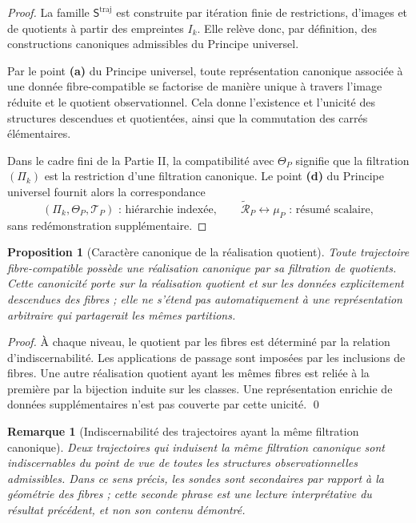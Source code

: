 \documentclass[11pt,a4paper,openany]{book}
\newtheorem{proposition}[definition]{Proposition}
\newtheorem{remark}[definition]{Remarque}
\begin{document}
\begin{proof}
La famille \(\mathsf S^{\mathrm{traj}}\) est construite par itération finie de restrictions, d'images et de quotients à partir des empreintes \(I_k\). Elle relève donc, par définition, des constructions canoniques admissibles du Principe universel.

Par le point \textbf{(a)} du Principe universel, toute représentation canonique associée à une donnée fibre-compatible se factorise de manière unique à travers l'image réduite et le quotient observationnel. Cela donne l'existence et l'unicité des structures descendues et quotientées, ainsi que la commutation des carrés élémentaires.

Dans le cadre fini de la Partie II, la compatibilité avec \(\Theta_P\) signifie que la filtration \((\Pi_k)\) est la restriction d'une filtration canonique. Le point \textbf{(d)} du Principe universel fournit alors la correspondance
\[
(\Pi_k,\Theta_P,\mathcal T_P)\text{ : hiérarchie indexée},\qquad \widetilde{\mathcal R}_P\leftrightarrow\mu_P\text{ : résumé scalaire},
\]
sans redémonstration supplémentaire.
\end{proof}

\begin{proposition}[Caractère canonique de la réalisation quotient]
Toute trajectoire fibre-compatible possède une réalisation canonique par sa filtration de quotients. Cette canonicité porte sur la réalisation quotient et sur les données explicitement descendues des fibres ; elle ne s'étend pas automatiquement à une représentation arbitraire qui partagerait les mêmes partitions.
\end{proposition}
\begin{proof}
À chaque niveau, le quotient par les fibres est déterminé par la relation d'indiscernabilité. Les applications de passage sont imposées par les inclusions de fibres. Une autre réalisation quotient ayant les mêmes fibres est reliée à la première par la bijection induite sur les classes. Une représentation enrichie de données supplémentaires n'est pas couverte par cette unicité.
\qed\end{proof}

\begin{remark}[Indiscernabilité des trajectoires ayant la même filtration canonique]
Deux trajectoires qui induisent la même filtration canonique sont indiscernables du point de vue de toutes les structures observationnelles admissibles. Dans ce sens précis, les sondes sont secondaires par rapport à la géométrie des fibres ; cette seconde phrase est une lecture interprétative du résultat précédent, et non son contenu démontré.
\end{remark}
\end{document}
